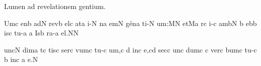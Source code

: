 
\beginhymn Lumen ad revelationem gentium.

\Internote
{}
\initiumgregorianum
{}%
\sgn {}Um\punctum c\egn
\sgn {}en\punctum b\egn
\spatium
\sgn {}ad\punctum N\egn
\spatium
\sgn rev\punctum b\egn
\sgn {}el\punctum c\egn
\sgn {}at\punctum a\egn
\sgn {}i-\punctum N\egn
{}n\punctum a\egn
\sgn {}em\punctum N\egn
\spatium
\sgn g{\'e}n\punctum a\egn
\sgn ti-\punctum N\egn
\sgn {}u{m:}\punctum M\augmentum N\egn
\spatium
\divisiominor
\spatium
\sgn {}et\pes Ma\egn
\spatium
{}r\punctum c\egn
\sgn {}i-\punctum c\egn
\sgn {}am\clivis bN\egn
\spatium
\custos b
\lineaproxima
{}eb\punctum b\egn
\sgn {}is\punctum c\egn
\spatium
\sgn tu-\punctum a\egn
\sgn {}{\ae}{}\punctum a\egn
\spatium
\sgn {}Is\punctum b\egn
\sgn ra-\punctum a\egn
\sgn {}e{l.}\punctum N\augmentum N\egn
\spatium
\Finisgregoriana

\bigskip

\initiumgregorianum
{}u{nc}\punctum N\egn
\spatium
\sgn dim\punctum a\egn
\sgn {}{\'\i}t\punctum c\egn
\sgn tis\punctum c\egn
\spatium
\sgn ser\punctum c\egn
\sgn vum\punctum c\egn
\spatium
\sgn tu-\punctum c\egn
\sgn {}u{m,}\punctum c\egn
\spatium
{}\punctum d\egn
\sgn {}in\punctumcavum c\egn
\sgn {}e,\punctum c\augmentum d\egn
\spatium
\Asteriscus
\divisiomaior
\spatium
\sgn sec\punctum c\egn
\sgn {}un\punctum c\egn
\sgn dum\punctum c\egn
\spatium
\custos c
\lineaproxima
\sgn ver\punctum c\egn
\sgn bum\punctum c\egn
\spatium
\sgn tu-\punctum c\egn
{}\punctum b\egn
\spatium
\sgn {}in\punctum c\egn
\spatium
{}\punctum a\egn
\sgn {}e.\punctum N\egn
\spatium
\Finisgregoriana

\bigskip

\beginlyrics

